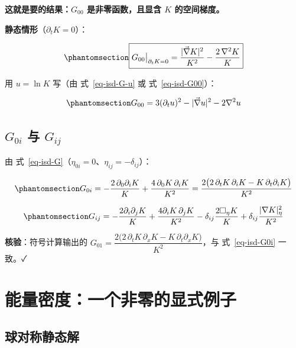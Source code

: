 \documentclass[
  chinese,
  a4paper,
  UTF8,
  12pt,
  oneside,
  openany]{ctexbook}
\theoremstyle{plain}
\theoremstyle{plain}
\theoremstyle{plain}
\theoremstyle{definition}
\theoremstyle{plain}
\theoremstyle{plain}
\theoremstyle{remark}
\begin{document}
\textbf{这就是要的结果：\(G_{00}\) 是非零函数，且显含 \(K\)
的空间梯度。}

\textbf{静态情形}（\(\partial_tK=0\)）：

\begin{equation}\protect\phantomsection\label{eq-isd-G00-static}{
\boxed{G_{00}\bigr|_{\partial_tK=0}=
\frac{\lvert\vec\nabla K\rvert^{2}}{K^{2}}-\frac{2\,\nabla^{2}K}{K}}
}\end{equation}

用 \(u=\ln K\) 写（由 式~\ref{eq-isd-G-u} 或 式~\ref{eq-isd-G00}）：

\begin{equation}\protect\phantomsection\label{eq-isd-G00-u}{
G_{00}=3(\partial_tu)^{2}-\lvert\vec\nabla u\rvert^{2}-2\nabla^{2}u
}\end{equation}

\subsection{\texorpdfstring{\(G_{0i}\) 与
\(G_{ij}\)}{G\_\{0i\} 与 G\_\{ij\}}}\label{g_0i-ux4e0e-g_ij}

由 式~\ref{eq-isd-G}（\(\eta_{0i}=0\)、\(\eta_{ij}=-\delta_{ij}\)）：

\begin{equation}\protect\phantomsection\label{eq-isd-G0i}{
G_{0i}=-\frac{2\,\partial_0\partial_iK}{K}+\frac{4\,\partial_0K\,\partial_iK}{K^{2}}
=\frac{2\bigl(2\,\partial_tK\,\partial_iK-K\,\partial_t\partial_iK\bigr)}{K^{2}}
}\end{equation}

\begin{equation}\protect\phantomsection\label{eq-isd-Gij}{
G_{ij}=
-\frac{2\partial_i\partial_jK}{K}
+\frac{4\partial_iK\,\partial_jK}{K^{2}}
-\delta_{ij}\frac{2\Box_\eta K}{K}
+\delta_{ij}\frac{\lvert\nabla K\rvert^{2}_{\eta}}{K^{2}}
}\end{equation}

\textbf{核验}：符号计算输出的
\(G_{01}=\dfrac{2\bigl(2\,\partial_tK\,\partial_xK-K\,\partial_t\partial_xK\bigr)}{K^{2}}\)，与
式~\ref{eq-isd-G0i} 一致。✓

\section{能量密度：一个非零的显式例子}\label{sec-isd-density}

\subsection{球对称静态解}\label{ux7403ux5bf9ux79f0ux9759ux6001ux89e3}
\end{document}
